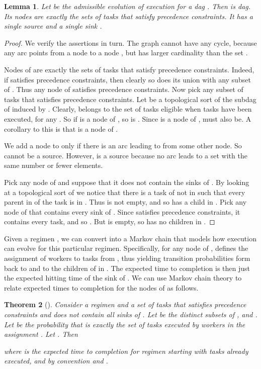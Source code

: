\documentclass[letterpaper,11pt]{article}
\newtheorem{theorem}{Theorem}[section]
\newtheorem{lemma}[theorem]{Lemma}
\begin{document}
\begin{lemma}
\label{l.dag}
Let  be the admissible evolution of execution for a dag . Then  is dag. Its nodes are exactly the sets of tasks that satisfy precedence constraints. It has a single source  and a single sink .
\end{lemma}

\begin{proof}
We verify the assertions in turn.
The graph  cannot have any cycle, because any arc points from a node  to a node , but  has larger cardinality than the set .

Nodes of  are exactly the sets of tasks that satisfy precedence constraints. Indeed, if  satisfies precedence constraints, then clearly so does its union with any subset of . Thus any node of  satisfies precedence constraints. Now pick any subset  of tasks that satisfies precedence constraints. Let  be a topological sort of the subdag of  induced by . Clearly,  belongs to the set of tasks eligible when tasks  have been executed, for any . So if  is a node of , so is . Since  is a node of ,  must also be. A corollary to this is that  is a node of .

We add a node  to  only if there is an arc leading to  from some other node. So  cannot be a source. However,  is a source because no arc leads to a set with the same number or fewer elements.

Pick any node  of  and suppose that it does not contain the sinks of . By looking at a topological sort of  we notice that there is a task of  not in  such that every parent in  of the task is in . Thus  is not empty, and so  has a child in . Pick any node  of  that contains every sink of . Since  satisfies precedence constraints, it contains every task, and so . But  is empty, so  has no children in .
\end{proof}


Given a regimen , we can convert  into a Markov chain that models how execution can evolve for this particular regimen. Specifically, for any node  of ,  defines the assignment of workers to tasks from , thus yielding transition probabilities form  back to  and to the children of  in . The expected time to completion is then just the expected hitting time of the sink of . We can use Markov chain theory to relate expected times to completion for the nodes of  as follows.

\begin{theorem}[\cite{Nor97}]
\label{t.recursive}
Consider a regimen  and a set  of tasks that satisfies precedence constraints and does not contain all sinks of .
Let  be the distinct subsets of , and .
Let  be the probability that  is exactly the set of tasks executed by workers in the assignment . Let . Then

where  is the expected time to completion for regimen  starting with tasks  already executed, and by convention  and .
\end{theorem}
\end{document}
